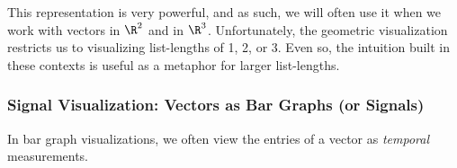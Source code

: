 
This representation is very powerful, and as such, we will often use it when we work with vectors in $\R^2$ and in $\R^3$.
Unfortunately, the geometric visualization restricts us to visualizing list-lengths of 1, 2, or 3.
Even so, the intuition built in these contexts is useful as a metaphor for larger list-lengths.



%






\newpage
\subsubsection{Signal Visualization: Vectors as Bar Graphs (or Signals)}
In bar graph visualizations, we often view the entries of a vector as \textit{temporal} measurements.

